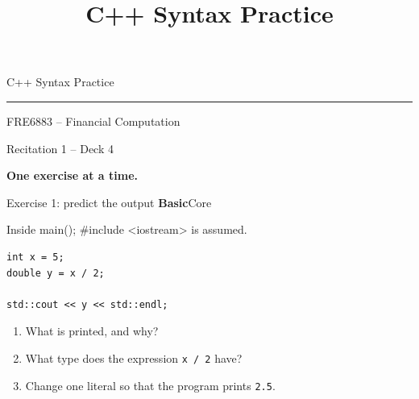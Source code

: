 \documentclass[10pt,aspectratio=169]{beamer}
\title{C++ Syntax Practice}
\author{}
\date{}
\newcommand{\exerciseinfo}[2]{%
  \textbf{#1}\hfill{\small #2}\par
}
\newcommand{\context}[1]{{\small #1\par}}
\begin{document}
\begin{frame}[plain]
\relax
\vfill
{C++ Syntax Practice\par}
\medskip
{\color{BootcampBlueDark}\rule{0.95\textwidth}{0.8pt}}
\bigskip
{\Large FRE6883 -- Financial Computation\par}
{\large Recitation 1 -- Deck 4\par}
\bigskip
\textbf{One exercise at a time.}\par

\end{frame}

\begin{frame}[fragile]{Exercise 1: predict the output}
\relax
\exerciseinfo{Basic}{Core}
\context{Inside main(); \#include <iostream> is assumed.}
\begin{center}
\begin{minipage}{0.78\textwidth}
\begin{lstlisting}
int x = 5;
double y = x / 2;

std::cout << y << std::endl;
\end{lstlisting}
\end{minipage}
\end{center}
\begin{enumerate}
\item What is printed, and why?
\item What type does the expression \texttt{x / 2} have?
\item Change one literal so that the program prints \texttt{2.5}.
\end{enumerate}
\end{frame}
\end{document}
